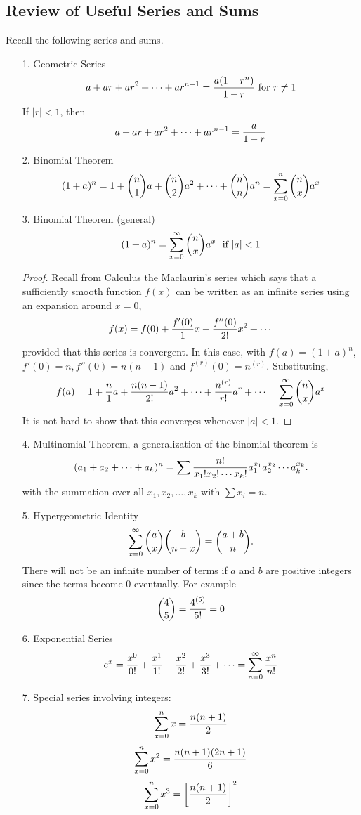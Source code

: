 \documentclass[english, 11pt]{article}
\begin{document}
  \subsection[Review]{Review of Useful Series and Sums}

  Recall the following series and sums.

  \begin{itemize}
    \item[1.] Geometric Series
    \[ a + ar + ar^2 + \cdots + ar^{n-1} = \frac{a(1-r^n)}{1-r} \mbox {\ for $r \not = 1$} \]
    If $|r| < 1$, then
    \[ a+ar + ar^2 + \cdots + ar^{n-1} = \frac{a}{1-r} \]
    \item[2.] Binomial Theorem
    \[ (1+a)^n = 1 + {n \choose 1}a + {n \choose 2}a^2 + \cdots + {n \choose n}a^n = \sum_{x=0}^n {n \choose x}a^x \]
    \item[3.] Binomial Theorem (general)
    \[ (1+a)^n = \sum_{x=0}^{\infty} {n \choose x} a^x \mbox{ \ if $|a| < 1$} \]
    \begin{proof}
      Recall from Calculus the Maclaurin's series which says that a sufficiently smooth function $f(x)$ can be written as an infinite series using an expansion around $x = 0$,
      \[ f(x) = f(0) + \frac{f'(0)}{1}x + \frac{f''(0)}{2!}x^2 + \cdots \]
      provided that this series is convergent. In this case, with $f(a) = (1+a)^n$, $f'(0) = n, f''(0) = n(n-1)$ and $f^{(r)}(0) = n^{(r)}$. Substituting,
      \[ f(a) = 1 + \frac{n}{1}a + \frac{n(n-1)}{2!}a^2 + \cdots + \frac{n^{(r)}}{r!} a^r + \cdots = \sum_{x=0}^{\infty} {n \choose x} a^x \]
      It is not hard to show that this converges whenever $|a| < 1$.
    \end{proof}
    \item[4.] Multinomial Theorem, a generalization of the binomial theorem is
    \[ (a_1 + a_2 + \cdots + a_k)^n = \sum \frac{n!}{x_1!x_2!\cdots x_k!} a_1^{x_1} a_2^{x_2} \cdots a_k^{x_k}.\]
    with the summation over all $x_1,x_2,\ldots,x_k$ with $\sum x_i = n$.
    \item[5.] Hypergeometric Identity
    \[ \sum_{x=0}^{\infty} {a \choose x}{b \choose n-x} = {a+b \choose n}. \]
    There will not be an infinite number of terms if $a$ and $b$ are positive integers since the terms become 0 eventually. For example
    \[ {4 \choose 5} = \frac{4^{(5)}}{5!} = 0 \]
    \item[6.] Exponential Series
    \[ e^x = \frac{x^0}{0!} + \frac{x^1}{1!} + \frac{x^2}{2!} + \frac{x^3}{3!} + \cdots = \sum_{n=0}^{\infty} \frac{x^n}{n!} \]
    \item[7.] Special series involving integers:
    \[ \sum_{x = 0}^{n} x = \frac{n(n+1)}{2} \]
    \[ \sum_{x=0}^n x^2 = \frac{n(n+1)(2n+1)}{6}\]
    \[ \sum_{x=0}^n x^3 = \left[ \frac{n(n+1)}{2} \right]^2 \]
  \end{itemize}
\end{document}
